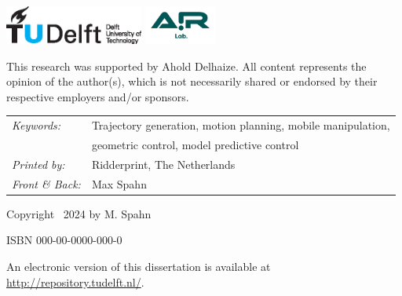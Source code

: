 \begin{titlepage}
\vfill
\begin{center}
    \includegraphics[height=0.5in]{logos/tudelft}
    \hspace{2em}
    \includegraphics[height=0.5in]{logos/airlab.png} \\
\end{center}
\vfill

This research was supported by Ahold Delhaize. All content represents the opinion
of the author(s), which is not necessarily shared or endorsed by their respective
employers and/or sponsors.

\noindent
\begin{tabular}{l l}
    \textit{Keywords:} & Trajectory generation, motion
    planning, mobile manipulation, \\
    & geometric control, model
    predictive control\\[\medskipamount]
    \textit{Printed by:} & Ridderprint, The Netherlands \\[\medskipamount]
    \textit{Front \& Back:} & Max Spahn
\end{tabular}

\vspace{4\bigskipamount}

\noindent Copyright \textcopyright\ 2024 by M. Spahn


\medskip
\noindent ISBN 000-00-0000-000-0

\medskip
\noindent An electronic version of this dissertation is available at \\
\url{http://repository.tudelft.nl/}.

\end{titlepage}

